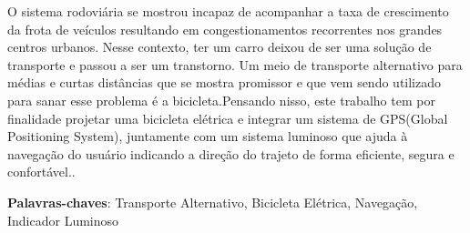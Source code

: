 \begin{resumo}
O sistema rodoviária se mostrou incapaz de acompanhar a taxa de crescimento da frota de veículos resultando em congestionamentos recorrentes nos grandes centros urbanos. Nesse contexto, ter um carro deixou de ser uma solução de transporte e passou a ser um transtorno. Um meio de transporte alternativo para médias e curtas distâncias que se mostra promissor e que vem sendo utilizado para sanar esse problema é a bicicleta.Pensando nisso, este trabalho tem por finalidade projetar uma bicicleta elétrica e integrar um sistema de GPS(Global Positioning System), juntamente com um sistema luminoso que ajuda à navegação do usuário indicando a direção do trajeto de forma eficiente, segura e confortável..
 \vspace{\onelineskip}

 \noindent
 \textbf{Palavras-chaves}: Transporte Alternativo, Bicicleta Elétrica, Navegação, Indicador Luminoso

\end{resumo}

